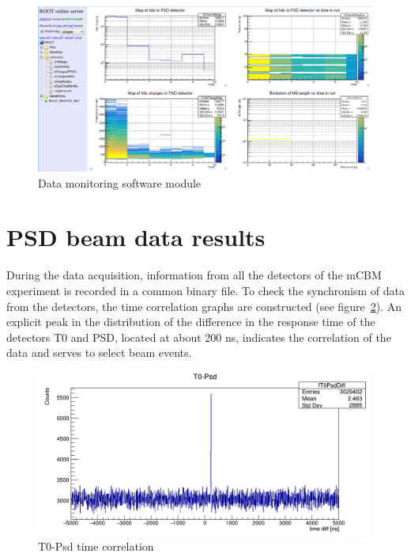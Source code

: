 \documentclass[a4paper,11pt]{article}
\begin{document}
\begin{figure}[htbp]
\centering %
\includegraphics[width=\textwidth]{run582.png}

\caption{\label{fig:5} Data monitoring software module}
\end{figure}

\section{PSD beam data results}
During the data acquisition, information from all the detectors of the mCBM experiment is recorded in a common binary file. To check the synchronism of data from the detectors, the time correlation graphs are constructed (see figure~\ref{fig:6}). An explicit peak in the distribution of the difference in the response time of the detectors T0 and PSD, located at about 200 ns, indicates the correlation of the data and serves to select beam events.

\begin{figure}[htbp]
\centering %
\includegraphics[width=\textwidth]{run582T0Psd.png}

\caption{\label{fig:6} T0-Psd time correlation}
\end{figure}
\end{document}
